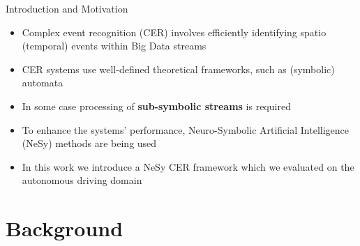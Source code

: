 \documentclass[10pt, aspectratio=169]{beamer}
\begin{document}
\begin{frame}{Introduction and Motivation}
    \begin{itemize}
        \setlength{\itemsep}{12pt}
        \item \textcolor{umBlueLighter}{Complex event recognition (CER)} involves efficiently identifying spatio (temporal) events within Big Data streams 
        \item CER systems use well-defined theoretical frameworks, such as (symbolic) automata
        \item In some case processing of \textbf{sub-symbolic streams} is required
        \item To enhance the systems' performance, \textcolor{umBlueLighter}{Neuro-Symbolic Artificial Intelligence (NeSy)} methods are being used
        \item In this work we introduce a NeSy CER framework which we evaluated on the autonomous driving domain
    \end{itemize}
\end{frame}

\section{Background}
{
    \begin{frame}
        \sectionpage%
    \end{frame}
}
\end{document}
